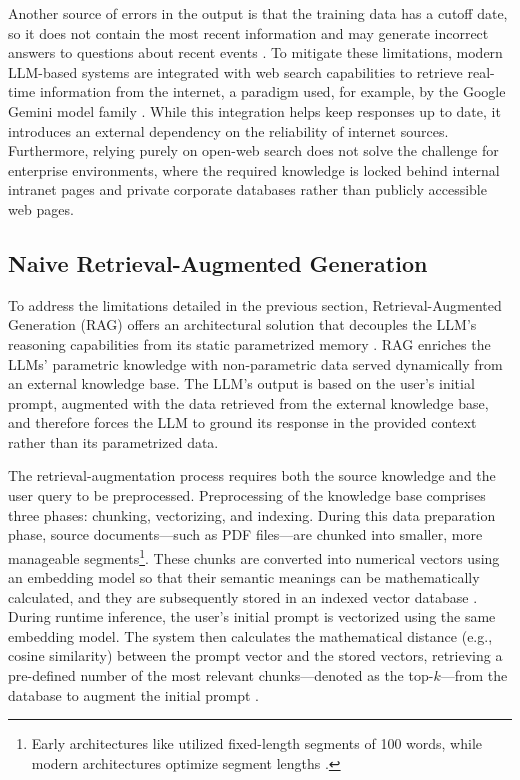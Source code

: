 Another source of errors in the output is that the training data has a cutoff date, so it does not contain the most recent information and may generate incorrect answers to questions about recent events \citep{dhingra2022time}. To mitigate these limitations, modern LLM-based systems are integrated with web search capabilities to retrieve real-time information from the internet, a paradigm used, for example, by the Google Gemini model family \cite{geminiteam2024gemini}. While this integration helps keep responses up to date, it introduces an external dependency on the reliability of internet sources. Furthermore, relying purely on open-web search does not solve the challenge for enterprise environments, where the required knowledge is locked behind internal intranet pages and private corporate databases rather than publicly accessible web pages.

\subsection{Naive Retrieval-Augmented Generation}

To address the limitations detailed in the previous section, Retrieval-Augmented Generation (RAG) offers an architectural solution that decouples the LLM's reasoning capabilities from its static parametrized memory \citep{lewis2020rag}. RAG enriches the LLMs' parametric knowledge with non-parametric data served dynamically from an external knowledge base. The LLM's output is based on the user's initial prompt, augmented with the data retrieved from the external knowledge base, and therefore forces the LLM to ground its response in the provided context rather than its parametrized data.

The retrieval-augmentation process requires both the source knowledge and the user query to be preprocessed. Preprocessing of the knowledge base comprises three phases: chunking, vectorizing, and indexing. During this data preparation phase, source documents---such as PDF files---are chunked into smaller, more manageable segments\footnote{Early architectures like \citet{lewis2020rag} utilized fixed-length segments of 100 words, while modern architectures optimize segment lengths \citep{demourajunior2026adaptive}.}. These chunks are converted into numerical vectors using an embedding model so that their semantic meanings can be mathematically calculated, and they are subsequently stored in an indexed vector database \citep{gao2023retrieval}. During runtime inference, the user's initial prompt is vectorized using the same embedding model. The system then calculates the mathematical distance (e.g., cosine similarity) between the prompt vector and the stored vectors, retrieving a pre-defined number of the most relevant chunks---denoted as the top-$k$---from the database to augment the initial prompt \citep{johnson2019billion}.

